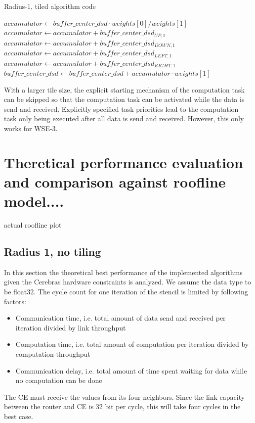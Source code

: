 \documentclass{article}
\begin{document}
\begin{algorithm}
    \caption{Radius-1, tiled algorithm code}
    \begin{algorithmic}[1]
        \State $accumulator \gets buffer\_center\_dsd \cdot weights[0]/weights[1]$
        \State $accumulator \gets accumulator + buffer\_center\_dsd_{UP,1}$
        \State $accumulator \gets accumulator + buffer\_center\_dsd_{DOWN,1}$
        \State $accumulator \gets accumulator + buffer\_center\_dsd_{LEFT,1}$
        \State $accumulator \gets accumulator + buffer\_center\_dsd_{RIGHT,1}$
        \State $buffer\_center\_dsd \gets buffer\_center\_dsd + accumulator \cdot weights[1]$
    \end{algorithmic}
\end{algorithm}

With a larger tile size, the explicit starting mechanism of the computation task can be skipped so that the computation task can be activated while the data is send and received. Explicitly specified task priorities lead to the computation task only being executed after all data is send and received. However, this only works for WSE-3.

\section{Theretical performance evaluation and comparison against roofline model....}
actual roofline plot
\subsection{Radius 1, no tiling}
In this section the theoretical best performance of the implemented algorithms given the Cerebras hardware constraints is analyzed.
We assume the data type to be float32.
The cycle count for one iteration of the stencil is limited by following factors:
\begin{itemize}
    \item Communication time, i.e. total amount of data send and received per iteration divided by link throughput
    \item Computation time, i.e. total amount of computation per iteration divided by computation throughput
    \item Communication delay, i.e. total amount of time spent waiting for data while no computation can be done
\end{itemize}
The CE must receive the values from its four neighbors. Since the link capacity between the router and CE is 32 bit per cycle, this will take four cycles in the best case.
\end{document}
